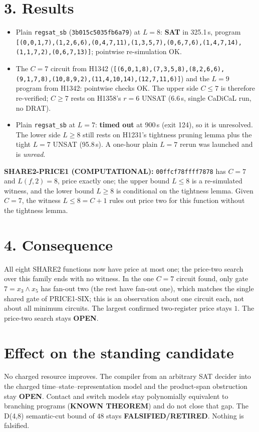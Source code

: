 \documentclass[11pt]{article}
\begin{document}
\section*{3. Results}
\begin{itemize}
\item Plain \texttt{regsat\_sb} (\texttt{3b015c5035fb6a79}) at $L=8$: \textbf{SAT} in 325.1\,s, program
\texttt{[(0,0,1,7),(1,2,6,6),(0,4,7,11),(1,3,5,7),(0,6,7,6),(1,4,7,14),(1,1,7,2),(0,6,7,13)]}; pointwise re-simulation OK.
\item The $C=7$ circuit from H1342 (\texttt{[(6,0,1,8),(7,3,5,8),(8,2,6,6),(9,1,7,8),(10,8,9,2),(11,4,10,14),(12,7,11,6)]}) and the $L=9$ program from H1342: pointwise checks OK. The upper side $C\le7$ is therefore re-verified; $C\ge7$ rests on H1358's $r=6$ UNSAT (6.6\,s, single CaDiCaL run, no DRAT).
\item Plain \texttt{regsat\_sb} at $L=7$: \textbf{timed out} at 900\,s (exit 124), so it is unresolved. The lower side $L\ge8$ still rests on H1231's tightness pruning lemma plus the tight $L=7$ UNSAT (95.8\,s). A one-hour plain $L=7$ rerun was launched and is \emph{unread}.
\end{itemize}
\textbf{SHARE2-PRICE1 (COMPUTATIONAL):} \texttt{00ffcf78ffff7878} has $C=7$ and $L(f,2)=8$, price exactly one; the upper bound $L\le8$ is a re-simulated witness, and the lower bound $L\ge8$ is conditional on the tightness lemma. Given $C=7$, the witness $L\le8=C+1$ rules out price two for this function without the tightness lemma.
\section*{4. Consequence}
All eight SHARE2 functions now have price at most one; the price-two search over this family ends with no witness. In the one $C=7$ circuit found, only gate $7=x_3\wedge x_5$ has fan-out two (the rest have fan-out one), which matches the single shared gate of PRICE1-SIX; this is an observation about one circuit each, not about all minimum circuits. The largest confirmed two-register price stays $1$. The price-two search stays \textbf{OPEN}.
\section*{Effect on the standing candidate}
No charged resource improves. The compiler from an arbitrary SAT decider into the charged time--state--representation model and the product-span obstruction stay \textbf{OPEN}. Contact and switch models stay polynomially equivalent to branching programs (\textbf{KNOWN THEOREM}) and do not close that gap. The D(4,8) semantic-cut bound of $48$ stays \textbf{FALSIFIED/RETIRED}. Nothing is falsified.
\end{document}
